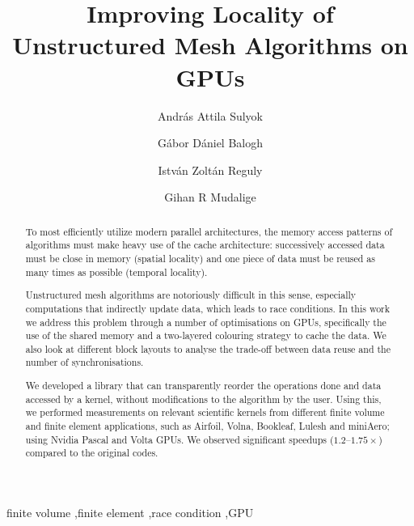 \documentclass[number]{elsarticle}
\begin{document}
\begin{frontmatter}

  \title{Improving Locality of Unstructured Mesh Algorithms on GPUs}

  \author[1]{András Attila Sulyok}
  \author[1]{Gábor Dániel Balogh}
  \author[1]{István Zoltán Reguly}
  \author[2]{Gihan R Mudalige}
  \address[1]{
    Faculty of Information Technology and Bionics,
    Pázmány Péter Catholic University,
    Hungary
  }
  \address[2]{
    Department of Computer Science,
    University of Warwick,
    United Kingdom
  }

  \begin{abstract}
    To most efficiently utilize modern parallel architectures, the memory access
    patterns of algorithms must make heavy use of the cache architecture:
    successively accessed data must be close in memory (spatial locality) and
    one piece of data must be reused as many times as possible (temporal
    locality).

    Unstructured mesh algorithms are notoriously difficult in this sense,
    especially computations that indirectly update data, which leads to race
    conditions. In this work we address this problem through a number of
    optimisations on GPUs, specifically the use of the shared memory and a
    two-layered colouring strategy to cache the data. We also look at different
    block layouts to analyse the trade-off between data reuse and the number of
    synchronisations.

    We developed a library that can transparently reorder the
    operations done and data accessed by a kernel, without modifications to the
    algorithm by the user. Using this, we performed measurements on relevant
    scientific kernels from different finite volume and finite element applications, such as Airfoil, Volna,
    Bookleaf, Lulesh and miniAero; using Nvidia Pascal and Volta GPUs. We
    observed significant speedups ($1.2\text{--}1.75\times$) compared to the
    original codes.
  \end{abstract}

  \begin{keyword}
    finite volume \sep finite element \sep race condition \sep GPU
  \end{keyword}

\end{frontmatter}



\end{document}
